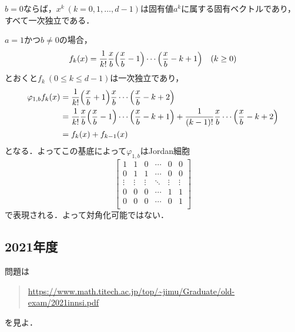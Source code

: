 \documentclass[a4j]{ltjsarticle}
\newcommand{\1}{\mathbbm{1}}
\numberwithin{equation}{section}
\theoremstyle{definition}
\begin{document}
$b=0$ならば，$x^k\ (k=0,1,\ldots,d-1)$は固有値$a^k$に属する固有ベクトルであり，すべて一次独立である．

$a=1$かつ$b\neq0$の場合，
\begin{equation}
    f_k(x)=\frac{1}{k!}\frac{x}{b}\qty(\frac{x}{b}-1)\cdots\qty(\frac{x}{b}-k+1)\quad (k\geq0)
\end{equation}
とおくと$f_k\ (0\leq k\leq d-1)$は一次独立であり，
\begin{align}
    \varphi_{1,b}f_{k}(x)&=\frac{1}{k!}\qty(\frac{x}{b}+1)\frac{x}{b}\cdots\qty(\frac{x}{b}-k+2)\\
    &=\frac{1}{k!}\frac{x}{b}\qty(\frac{x}{b}-1)\cdots\qty(\frac{x}{b}-k+1)+\frac{1}{(k-1)!}\frac{x}{b}\cdots\qty(\frac{x}{b}-k+2)\\
    &=f_{k}(x)+f_{k-1}(x)
\end{align}
となる．よってこの基底によって$\varphi_{1,b}$はJordan細胞
\begin{equation}
    \begin{bmatrix}
        1 & 1 & 0 & \cdots & 0 & 0 \\
        0 & 1 & 1 & \cdots & 0 & 0 \\
        \vdots & \vdots & \vdots & \ddots & \vdots & \vdots \\
        0 & 0 & 0 & \cdots & 1 & 1 \\
        0 & 0 & 0 & \cdots & 0 & 1 \\
    \end{bmatrix}
\end{equation}
で表現される．よって対角化可能ではない．

\subsection{2021年度}
問題は
\begin{quote}
    \url{https://www.math.titech.ac.jp/top/~jimu/Graduate/old-exam/2021innsi.pdf}
\end{quote}
を見よ．
\end{document}
